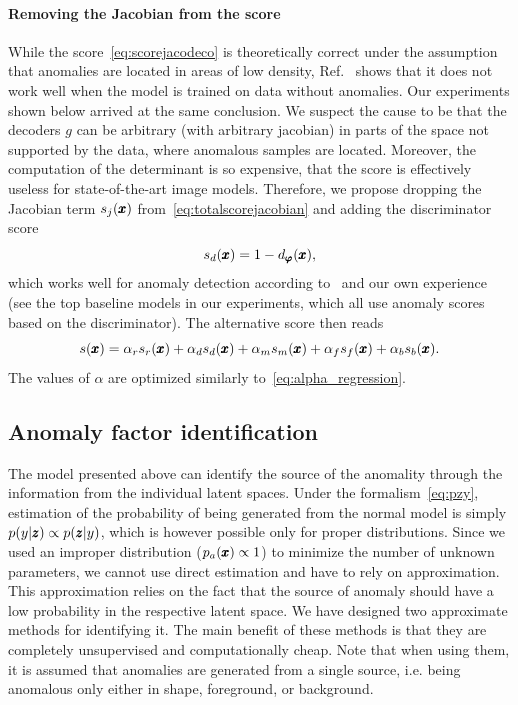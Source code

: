 \paragraph{Removing the Jacobian from the score} 
While the score~\eqref{eq:scorejacodeco} is theoretically correct under the assumption that anomalies are located in areas of low density, Ref.~\cite{vsmidl2019anomaly} shows that it does not work well when the model is trained on data without anomalies. Our experiments shown below arrived at the same conclusion. We suspect the cause to be that the decoders $g$ can be arbitrary (with arbitrary jacobian) in parts of the space not supported by the data, where anomalous samples are located. Moreover, the computation of the determinant is so expensive, that the score is effectively useless for state-of-the-art image models. Therefore, we propose dropping the Jacobian term $s_j(\pmb{{x}})$ from~\eqref{eq:totalscorejacobian} and adding the discriminator score
\begin{equation} \label{eq:discscore}
    s_d(\pmb{{x}}) = 1 - d_{\pmb{{\varphi}}}(\pmb{{x}}),
\end{equation}
which works well for anomaly detection according to~\cite{larsen2016autoencoding} and our own  experience (see the top baseline models in our experiments, which all use anomaly scores based on the discriminator). The alternative score then reads
\begin{equation} \label{eq:totalscoredisc}
    s(\pmb{{x}}) = \alpha_{r}  s_{r}(\pmb{{x}}) + \alpha_d s_d(\pmb{{x}}) + \alpha_m s_{m}(\pmb{{x}}) + \alpha_f s_{f}(\pmb{{x}}) + \alpha_b s_{b}(\pmb{{x}}).
\end{equation}
The values of $\alpha$ are optimized similarly to~\eqref{eq:alpha_regression}.

\subsection{Anomaly factor identification}
\label{sec:anomaly_factor_identification}
The model presented above can identify the source of the anomality through the information from the individual latent spaces. Under the formalism~\eqref{eq:pzy}, estimation of the probability of being generated from the normal model is simply $p(y \vert \pmb{{z}})\propto p(\pmb{{z}} \vert y)$, which is however possible only for proper distributions. Since we used an improper distribution ($p_a(\pmb{{x}})\propto 1$) to minimize the number of unknown parameters, we cannot use direct estimation and have to rely on approximation. This approximation relies on the fact that the source of anomaly should have a low probability in the respective latent space. We have designed two approximate methods for identifying it. The main benefit of these methods is that they are completely unsupervised and computationally cheap. Note that when using them, it is assumed that anomalies are generated from a single source, i.e. being anomalous only either in shape, foreground, or background. 

